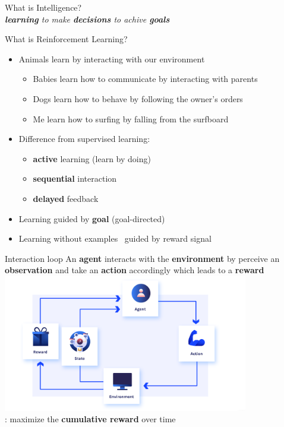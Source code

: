 \documentclass[presentation, 9pt]{beamer}\mode<presentation>{\usetheme{AMSBolognaFC}}
\begin{document}
\begin{frame}[plain,c]
	\begin{center}
	\Huge What is Intelligence?
	\\
	\huge \emph{\textbf{learning} to make \textbf{decisions} to achive \textbf{goals}}
	\end{center}
\end{frame}
\begin{frame}{What is Reinforcement Learning?}
\begin{itemize}
	\item Animals learn by interacting with our environment
	\begin{itemize}
		\item Babies learn how to communicate by interacting with parents
		\item Dogs learn how to behave by following the owner's orders
		\item Me learn how to surfing by falling from the surfboard
	\end{itemize}
	\item Difference from supervised learning:
	\begin{itemize}
		\item \textbf{active} learning (learn by doing)
		\item \textbf{sequential} interaction 
		\item \textbf{delayed} feedback
	\end{itemize}
	\item Learning guided by \textbf{goal} (goal-directed)
	\item Learning without examples \faArrowRight \, guided by reward signal
\end{itemize}
\end{frame}

\begin{frame}{Interaction loop}
\centering
\Large An \textbf{agent} interacts with the \textbf{environment} by perceive an \textbf{observation} and take an \textbf{action} accordingly which leads to a \textbf{reward}
\\
\includegraphics[height=6cm]{img/interaction-loop.png}
\\
\Large
{}: maximize the \textbf{cumulative reward} over time
\end{frame}
\end{document}
